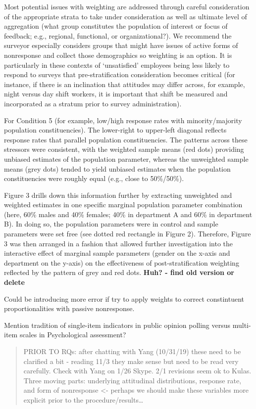 \documentclass[
  man,mask]{apa7}
\begin{document}
Most potential issues with weighting are addressed through careful consideration of the appropriate strata to take under consideration as well as ultimate level of aggregation (what group constitutes the population of interest or focus of feedback; e.g., regional, functional, or organizational?). We recommend the surveyor especially considers groups that might have issues of active forms of nonresponse and collect those demographics so weighting is an option. It is particularly in these contexts of `unsatisfied' employees being less likely to respond to surveys that pre-stratification consideration becomes critical (for instance, if there is an inclination that attitudes may differ across, for example, night versus day shift workers, it is important that shift be measured and incorporated as a stratum prior to survey administration).

For Condition 5 (for example, low/high response rates with minority/majority population constituencies). The lower-right to upper-left diagonal reflects response rates that parallel population constituencies. The patterns across these stressors were consistent, with the weighted sample means (red dots) providing unbiased estimates of the population parameter, whereas the unweighted sample means (grey dots) tended to yield unbiased estimates when the population constituencies were roughly equal (e.g., close to 50\%/50\%).

Figure 3 drills down this information further by extracting unweighted and weighted estimates in one specific marginal population parameter combination (here, 60\% males and 40\% females; 40\% in department A and 60\% in department B). In doing so, the population parameters were in control and sample parameters were set free (see dotted red rectangle in Figure 2). Therefore, Figure 3 was then arranged in a fashion that allowed further investigation into the interactive effect of marginal sample parameters (gender on the x-axis and department on the y-axis) on the effectiveness of post-stratification weighting reflected by the pattern of grey and red dots. \textbf{Huh? - find old version or delete}

Could be introducing more error if try to apply weights to correct constintuent proportionalities with passive nonresponse.

Mention tradition of single-item indicators in public opinion polling versus multi-item scales in Psychological assessment?

\begin{quote}
PRIOR TO RQs: after chatting with Yang (10/31/19) these need to be clarified a bit - reading 11/3 they make sense but need to be read very carefully. Check with Yang on 1/26 Skype. 2/1 revisions seem ok to Kulas. Three moving parts: underlying attitudinal distributions, response rate, and form of nonresponse \textless- perhaps we should make these variables more explicit prior to the procedure/results\ldots{}
\end{quote}
\end{document}
